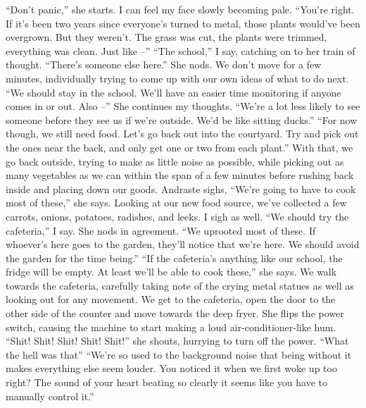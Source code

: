 \documentclass[a4paper, 12pt]{book}
\newcommand\tab[1][1cm]{\hspace*{#1}}
\begin{document}
\newline
\tab
“Don’t panic,” she starts. I can feel my face slowly becoming pale. “You’re right. If it’s been two years since everyone’s turned to metal, those plants would’ve been overgrown. But they weren’t. The grass was cut, the plants were trimmed, everything was clean. Just like –”
\newline
\tab
“The school,” I say, catching on to her train of thought. “There’s someone else here.” She nods. We don’t move for a few minutes, individually trying to come up with our own ideas of what to do next. “We should stay in the school. We’ll have an easier time monitoring if anyone comes in or out. Also –”
\newline
\tab
She continues my thoughts. “We’re a lot less likely to see someone before they see us if we’re outside. We’d be like sitting ducks.”
\newline
\tab
“For now though, we still need food. Let’s go back out into the courtyard. Try and pick out the ones near the back, and only get one or two from each plant.” With that, we go back outside, trying to make as little noise as possible, while picking out as many vegetables as we can within the span of a few minutes before rushing back inside and placing down our goods.
\newline
\tab
Andraste sighs, “We’re going to have to cook most of these,” she says. Looking at our new food source, we’ve collected a few carrots, onions, potatoes, radishes, and leeks. I sigh as well.
\newline
\tab
“We should try the cafeteria,” I say. She nods in agreement. “We uprooted most of these. If whoever’s here goes to the garden, they’ll notice that we’re here. We should avoid the garden for the time being.”
\newline
\tab
“If the cafeteria’s anything like our school, the fridge will be empty. At least we’ll be able to cook these,” she says. We walk towards the cafeteria, carefully taking note of the crying metal statues as well as looking out for any movement.
\newline
\tab
We get to the cafeteria, open the door to the other side of the counter and move towards the deep fryer. She flips the power switch, causing the machine to start making a loud air-conditioner-like hum. “Shit! Shit! Shit! Shit! Shit!” she shouts, hurrying to turn off the power. “What the hell was that\textinterrobang”
\newline
\tab
“We’re so used to the background noise that being without it makes everything else seem louder. You noticed it when we first woke up too right? The sound of your heart beating so clearly it seems like you have to manually control it.”
\end{document}
